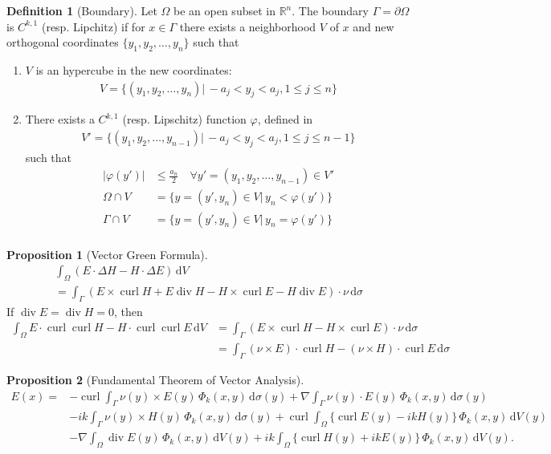 \documentclass[a4paper,12pt]{article}
\theoremstyle{definition}
\newtheorem{dfn}{Definition}
\newtheorem{prp}{Proposition}
\newcommand\bdr{\Gamma}
\newcommand\intv[2][y]{\int_{\Omega}#2\,\text{d}V(#1)}
\newcommand\intvn[1]{\int_{\Omega}#1\,\text{d}V}
\newcommand\ints[2][y]{\int_{\bdr}#2\,\text{d}\sigma(#1)}
\newcommand\intsn[1]{\int_{\bdr}#1\,\text{d}\sigma}
\DeclareMathOperator\curl{curl}
\DeclareMathOperator\divv{div}
\begin{document}
\begin{dfn}[Boundary]
  Let $\Omega$ be an open subset in $\mathbb{R}^n$. The boundary $\bdr=\partial\Omega$ is $C^{k,1}$ (resp. Lipchitz) if for $x\in\bdr$ there exists a neighborhood $V$ of $x$ and new orthogonal coordinates $\{y_1, y_2, \ldots, y_n\}$ such that 
  \begin{enumerate}
    \item $V$ is an hypercube in the new coordinates:
      \begin{align*}
        V = \{(y_1, y_2, \ldots,y_n)|\,-a_j<y_j<a_j, 1\leqslant j\leqslant n\}
      \end{align*}
    \item There exists a $C^{k, 1}$ (resp. Lipschitz) function $\varphi$, defined in
      \begin{align*}
        V' = \{(y_1, y_2, \ldots,y_{n-1})|\,-a_j<y_j<a_j, 1\leqslant j\leqslant n-1\}
      \end{align*}
      such that
      \begin{align*}
        |\varphi(y')| &\leqslant \frac{a_n}{2}\quad\forall y'=(y_1, y_2,\ldots, y_{n-1})\in V' \\
        \Omega\cap V &= \{y=(y', y_n)\in V|\,y_n<\varphi(y')\} \\
        \bdr\cap V &= \{y=(y', y_n)\in V|\,y_n=\varphi(y')\} \\
      \end{align*}
  \end{enumerate}
\end{dfn}

\begin{prp}[Vector Green Formula]
  \begin{multline*}
    \intvn{\left(E\cdot\Delta H - H\cdot\Delta E\right)}\\=\intsn{\left(E\times\curl H + E\divv H - H\times\curl E - H\divv E\right)\cdot\nu}
  \end{multline*}
  If $\divv E=\divv H=0$, then
  \begin{equation}\label{eq:green}
  \begin{split}
    \intvn{E\cdot\curl\curl H - H\cdot\curl\curl E} &=\intsn{\left(E\times\curl H - H\times\curl E\right)\cdot\nu}\\
    &=\intsn{(\nu\times E)\cdot\curl H - (\nu\times H)\cdot\curl E}
  \end{split}
\end{equation}
\end{prp}

\begin{prp}[Fundamental Theorem of Vector Analysis]
  \begin{align*}
    E(x)= &-\curl\ints{\nu(y)\times E(y)\,\Phi_k(x,y)}+\nabla\ints{\nu(y)\cdot E(y)\,\Phi_k(x,y)} \\
    &-ik\ints{\nu(y)\times H(y)\,\Phi_k(x,y)}+\curl\intv{\bigl\{\curl E(y)-ikH(y)\bigr\}\,\Phi_k(x,y)} \\
          &-\nabla\intv{\divv E(y)\,\Phi_k(x,y)}+ik\intv{\bigl\{\curl H(y)+ikE(y)\bigr\}\,\Phi_k(x,y)}.
  \end{align*}
\end{prp}
\end{document}
